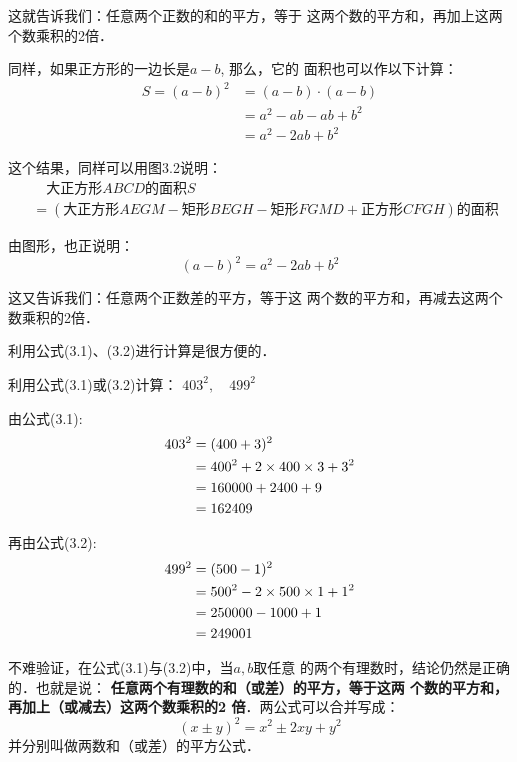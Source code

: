 这就告诉我们：任意两个正数的和的平方，等于
这两个数的平方和，再加上这两个数乘积的2倍．

同样，如果正方形的一边长是$a-b$, 那么，它的
面积也可以作以下计算：
\[\begin{split}
  S=(a-b)^2 &= ( a-b)\cdot (a-b)\\
  &=a^2-ab-ab+b^2\\
  &=a^2-2ab+b^2
\end{split}\]



这个结果，同样可以用图3.2说明：
\[\begin{split}
 & \quad \text{大正方形$ABCD$的面积$S$}\\
 &=(\text{大正方形}AEGM-\text{矩形}BEGH-\text{矩形}FGMD+\text{正方形}CFGH)\text{的面积}
\end{split}\]

由图形，也正说明：
\begin{equation}
    (a-b)^2=a^2-2ab+b^2
\end{equation}

这又告诉我们：任意两个正数差的平方，等于这
两个数的平方和，再减去这两个数乘积的2倍．

利用公式(3.1)、(3.2)进行计算是很方便的．

\begin{example}
利用公式(3.1)或(3.2)计算：
$403^2,\quad 499^2$
\end{example}

\begin{solution}
    由公式(3.1):
    \[\begin{split}
        403^2&=(400+3)^2\\
    &=400^2+2\times400\times3+3^2\\
    &=160000+2400+9\\
    &=162409
    \end{split}\]
    
    再由公式(3.2):
    \[\begin{split}
         499^2&=(500-1)^2\\
         &=500^2-2\times500\times1+1^2\\
         &=250000-1000+1\\
         &=249001   
    \end{split}\]
\end{solution}  

不难验证，在公式(3.1)与(3.2)中，当$a,b$取任意
的两个有理数时，结论仍然是正确的．也就是说：
\textbf{任意两个有理数的和（或差）的平方，等于这两
个数的平方和，再加上（或减去）这两个数乘积的2
倍}．两公式可以合并写成：
\[(x\pm y)^2=x^2\pm 2xy+y^2\]
并分别叫做两数和（或差）的平方公式．

